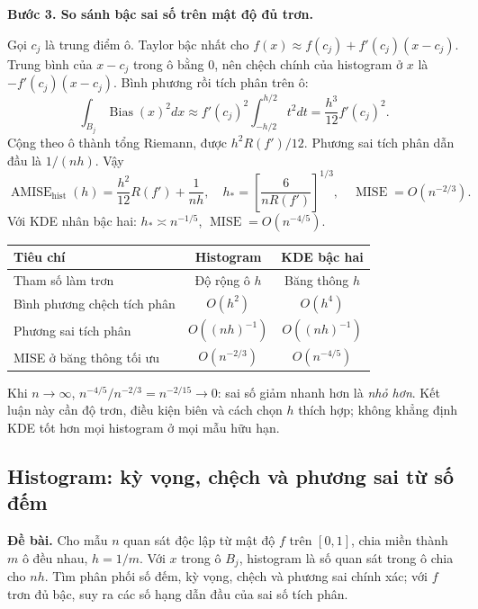 \documentclass[11pt,a4paper]{article}
\DeclareMathOperator{\MISE}{MISE}
\DeclareMathOperator{\AMISE}{AMISE}
\DeclareMathOperator{\Bias}{Bias}
\newcommand{\buoc}[1]{\par\medskip\textbf{#1}\par}
\begin{document}
\buoc{Bước 3. So sánh bậc sai số trên mật độ đủ trơn.}
Gọi $c_j$ là trung điểm ô. Taylor bậc nhất cho
$f(x)\approx f(c_j)+f'(c_j)(x-c_j)$. Trung bình của $x-c_j$ trong ô bằng 0, nên chệch chính của histogram ở $x$ là $-f'(c_j)(x-c_j)$. Bình phương rồi tích phân trên ô:
\[
\int_{B_j}\Bias(x)^2dx\approx f'(c_j)^2\int_{-h/2}^{h/2}t^2dt
=\frac{h^3}{12}f'(c_j)^2.
\]
Cộng theo ô thành tổng Riemann, được $h^2R(f')/12$. Phương sai tích phân dẫn đầu là $1/(nh)$. Vậy
\[
\AMISE_{\mathrm{hist}}(h)=\frac{h^2}{12}R(f')+\frac1{nh},
\quad h_* =\left[\frac6{nR(f')}\right]^{1/3},
\quad\MISE=O(n^{-2/3}).
\]
Với KDE nhân bậc hai: $h_*\asymp n^{-1/5}$, $\MISE=O(n^{-4/5})$.
\begin{center}
\begin{tabular}{lcc}
\toprule
Tiêu chí & Histogram & KDE bậc hai\\
\midrule
Tham số làm trơn & Độ rộng ô $h$ & Băng thông $h$\\
Bình phương chệch tích phân & $O(h^2)$ & $O(h^4)$\\
Phương sai tích phân & $O((nh)^{-1})$ & $O((nh)^{-1})$\\
MISE ở băng thông tối ưu & $O(n^{-2/3})$ & $O(n^{-4/5})$\\
\bottomrule
\end{tabular}
\end{center}
Khi $n\to\infty$, $n^{-4/5}/n^{-2/3}=n^{-2/15}\to0$: sai số giảm nhanh hơn là \emph{nhỏ hơn}. Kết luận này cần độ trơn, điều kiện biên và cách chọn $h$ thích hợp; không khẳng định KDE tốt hơn mọi histogram ở mọi mẫu hữu hạn.

\subsection{Histogram: kỳ vọng, chệch và phương sai từ số đếm}\label{sec:hist-detail}
\textbf{Đề bài.} Cho mẫu $n$ quan sát độc lập từ mật độ $f$ trên $[0,1]$,
chia miền thành $m$ ô đều nhau, $h=1/m$.
Với $x$ trong ô $B_j$, histogram là số quan sát trong ô chia cho $nh$.
Tìm phân phối số đếm, kỳ vọng, chệch và phương sai chính xác;
với $f$ trơn đủ bậc, suy ra các số hạng dẫn đầu của sai số tích phân.
\end{document}
